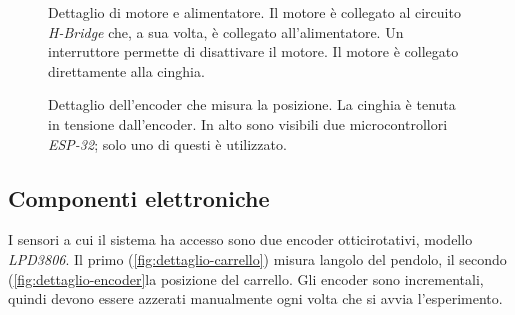 \begin{figure}[h]
    \centering
    \caption[Dettaglio del motore]{Dettaglio di motore e alimentatore.
    Il motore è collegato al circuito \emph{H-Bridge} che, a sua volta, è collegato
    all'alimentatore. Un interruttore permette di disattivare il motore.
    Il motore è collegato direttamente alla cinghia.}
    \label{fig:dettaglio-motore}
\end{figure}
\begin{figure}[h]
    \centering
    \caption[Dettaglio encoder]{Dettaglio dell'encoder che misura la posizione.
    La cinghia è tenuta in tensione dall'encoder.
    In alto sono visibili due microcontrollori
    \emph{ESP-32}; solo uno di questi è utilizzato.
    }
    \label{fig:dettaglio-encoder}
\end{figure}


\subsection{Componenti elettroniche}
\label{subsec:componenti-elettroniche}

I sensori a cui il sistema ha accesso sono due encoder ottici\footnotemark rotativi,
modello \emph{LPD3806}. Il primo (\autoref{fig:dettaglio-carrello}) misura langolo del pendolo,
il secondo (\autoref{fig:dettaglio-encoder}la posizione del carrello.
Gli encoder sono incrementali, quindi devono essere azzerati manualmente
ogni volta che si avvia l'esperimento.


